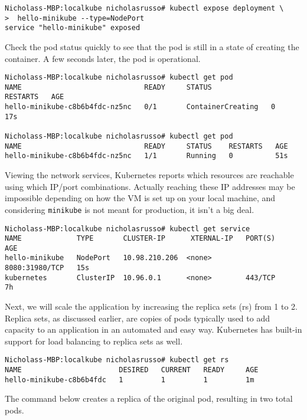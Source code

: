 \begin{verbatim}
Nicholass-MBP:localkube nicholasrusso# kubectl expose deployment \
>  hello-minikube --type=NodePort
service "hello-minikube" exposed
\end{verbatim}

Check the pod status quickly to see that the pod is still in a state of creating the
container. A few seconds later, the pod is operational.

\begin{verbatim}
Nicholass-MBP:localkube nicholasrusso# kubectl get pod
NAME                             READY     STATUS              RESTARTS   AGE
hello-minikube-c8b6b4fdc-nz5nc   0/1       ContainerCreating   0          17s

Nicholass-MBP:localkube nicholasrusso# kubectl get pod
NAME                             READY     STATUS    RESTARTS   AGE
hello-minikube-c8b6b4fdc-nz5nc   1/1       Running   0          51s
\end{verbatim}

Viewing the network services, Kubernetes reports which resources are reachable
using which IP/port combinations. Actually reaching these IP addresses may be
impossible depending on how the VM is set up on your local machine, and
considering \verb|minikube| is not meant for production, it isn't a big deal.

\begin{verbatim}
Nicholass-MBP:localkube nicholasrusso# kubectl get service
NAME             TYPE       CLUSTER-IP      XTERNAL-IP   PORT(S)          AGE
hello-minikube   NodePort   10.98.210.206  <none>        8080:31980/TCP   15s
kubernetes       ClusterIP  10.96.0.1      <none>        443/TCP          7h
\end{verbatim}

Next, we will scale the application by increasing the replica sets (rs) from 1
to 2. Replica sets, as discussed earlier, are copies of pods typically used to
add capacity to an application in an automated and easy way. Kubernetes has
built-in support for load balancing to replica sets as well.

\begin{verbatim}
Nicholass-MBP:localkube nicholasrusso# kubectl get rs
NAME                       DESIRED   CURRENT   READY     AGE
hello-minikube-c8b6b4fdc   1         1         1         1m
\end{verbatim}

The command below creates a replica of the original pod, resulting in two total pods.

